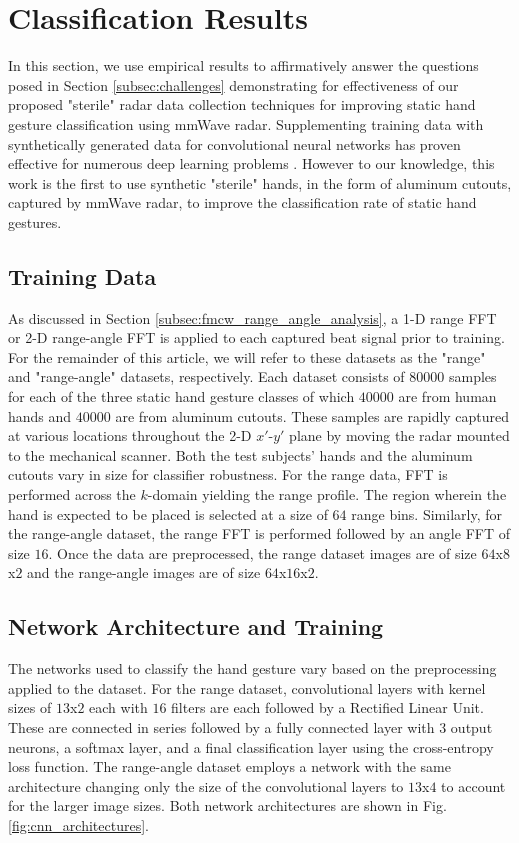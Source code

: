 \documentclass{ieeeaccess}
\begin{document}
\section{Classification Results}
\label{sec:classification_results}
In this section, we use empirical results to affirmatively answer the questions posed in Section \ref{subsec:challenges} demonstrating for effectiveness of our proposed "sterile" radar data collection techniques for improving static hand gesture classification using mmWave radar. Supplementing training data with synthetically generated data for convolutional neural networks has proven effective for numerous deep learning problems \cite{synthetic_data:face,synthetic_data:FaultSeg3D,synthetic_data:fish,synthetic_data:license_plate}. However to our knowledge, this work is the first to use synthetic "sterile" hands, in the form of aluminum cutouts, captured by mmWave radar, to improve the classification rate of static hand gestures.

\subsection{Training Data}
\label{subsec:training_data}
As discussed in Section \ref{subsec:fmcw_range_angle_analysis}, a 1-D range FFT or 2-D range-angle FFT is applied to each captured beat signal prior to training. For the remainder of this article, we will refer to these datasets as the "range" and "range-angle" datasets, respectively. Each dataset consists of $80000$ samples for each of the three static hand gesture classes of which $40000$ are from human hands and $40000$ are from aluminum cutouts. These samples are rapidly captured at various locations throughout the 2-D $x'$-$y'$ plane by moving the radar mounted to the mechanical scanner. Both the test subjects' hands and the aluminum cutouts vary in size for classifier robustness. For the range data, FFT is performed across the $k$-domain yielding the range profile. The region wherein the hand is expected to be placed is selected at a size of $64$ range bins. Similarly, for the range-angle dataset, the range FFT is performed followed by an angle FFT of size $16$. Once the data are preprocessed, the range dataset images are of size $64$x$8$x$2$ and the range-angle images are of size $64$x$16$x$2$. 

\subsection{Network Architecture and Training}
\label{subsec:network_architecture}
The networks used to classify the hand gesture vary based on the preprocessing applied to the dataset. For the range dataset, convolutional layers with kernel sizes of $13$x$2$ each with $16$ filters are each followed by a Rectified Linear Unit. These are connected in series followed by a fully connected layer with $3$ output neurons, a softmax layer, and a final classification layer using the cross-entropy loss function. The range-angle dataset employs a network with the same architecture changing only the size of the convolutional layers to $13$x$4$ to account for the larger image sizes. Both network architectures are shown in Fig. \ref{fig:cnn_architectures}. 
\end{document}
